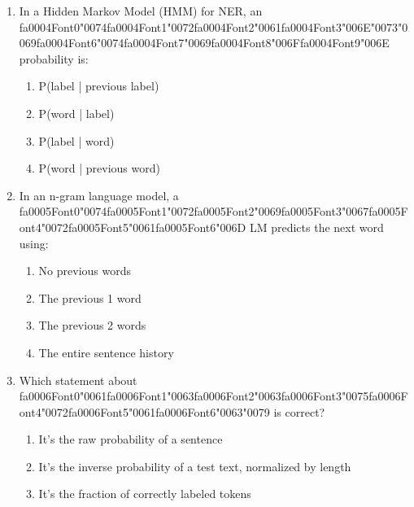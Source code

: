 \documentclass[12pt]{article}
\begin{document}
\begin{enumerate}[label=Q\arabic*.]
\begin{enumerate}[label=(\Alph*)]
    \item It models emissions P(word | label)
    \item It is identical to an HMM
\end{enumerate}
\item In a Hidden Markov Model (HMM) for NER, an {\csname fa0004Font0\endcsname\char"0074}{\csname fa0004Font1\endcsname\char"0072}{\csname fa0004Font2\endcsname\char"0061}{\csname fa0004Font3\endcsname\char"006E}{\char"0073}{\char"0069}{\csname fa0004Font6\endcsname\char"0074}{\csname fa0004Font7\endcsname\char"0069}{\csname fa0004Font8\endcsname\char"006F}{\csname fa0004Font9\endcsname\char"006E} probability is:
\begin{enumerate}[label=(\Alph*)]
    \item P(label | previous label)
    \item P(word | label)
    \item P(label | word)
    \item P(word | previous word)
\end{enumerate}
\item In an n-gram language model, a {\csname fa0005Font0\endcsname\char"0074}{\csname fa0005Font1\endcsname\char"0072}{\csname fa0005Font2\endcsname\char"0069}{\csname fa0005Font3\endcsname\char"0067}{\csname fa0005Font4\endcsname\char"0072}{\csname fa0005Font5\endcsname\char"0061}{\csname fa0005Font6\endcsname\char"006D} LM predicts the next word using:
\begin{enumerate}[label=(\Alph*)]
    \item No previous words
    \item The previous 1 word
    \item The previous 2 words
    \item The entire sentence history
\end{enumerate}
\item Which statement about {\csname fa0006Font0\endcsname\char"0061}{\csname fa0006Font1\endcsname\char"0063}{\csname fa0006Font2\endcsname\char"0063}{\csname fa0006Font3\endcsname\char"0075}{\csname fa0006Font4\endcsname\char"0072}{\csname fa0006Font5\endcsname\char"0061}{\csname fa0006Font6\endcsname\char"0063}{\char"0079} is correct?
\begin{enumerate}[label=(\Alph*)]
    \item It's the raw probability of a sentence
    \item It's the inverse probability of a test text, normalized by length
    \item It's the fraction of correctly labeled tokens

\end{enumerate}
\end{enumerate}
\end{document}
